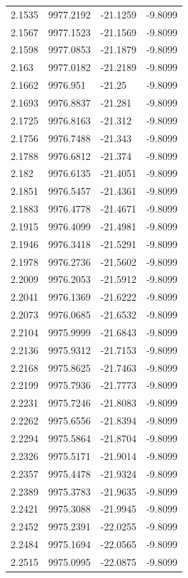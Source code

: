 \begin{table}[H]
\begin{tabular}{llll}
2.1535 & 9977.2192 & -21.1259 & -9.8099 \\
2.1567 & 9977.1523 & -21.1569 & -9.8099 \\
2.1598 & 9977.0853 & -21.1879 & -9.8099 \\
2.163 & 9977.0182 & -21.2189 & -9.8099 \\
2.1662 & 9976.951 & -21.25 & -9.8099 \\
2.1693 & 9976.8837 & -21.281 & -9.8099 \\
2.1725 & 9976.8163 & -21.312 & -9.8099 \\
2.1756 & 9976.7488 & -21.343 & -9.8099 \\
2.1788 & 9976.6812 & -21.374 & -9.8099 \\
2.182 & 9976.6135 & -21.4051 & -9.8099 \\
2.1851 & 9976.5457 & -21.4361 & -9.8099 \\
2.1883 & 9976.4778 & -21.4671 & -9.8099 \\
2.1915 & 9976.4099 & -21.4981 & -9.8099 \\
2.1946 & 9976.3418 & -21.5291 & -9.8099 \\
2.1978 & 9976.2736 & -21.5602 & -9.8099 \\
2.2009 & 9976.2053 & -21.5912 & -9.8099 \\
2.2041 & 9976.1369 & -21.6222 & -9.8099 \\
2.2073 & 9976.0685 & -21.6532 & -9.8099 \\
2.2104 & 9975.9999 & -21.6843 & -9.8099 \\
2.2136 & 9975.9312 & -21.7153 & -9.8099 \\
2.2168 & 9975.8625 & -21.7463 & -9.8099 \\
2.2199 & 9975.7936 & -21.7773 & -9.8099 \\
2.2231 & 9975.7246 & -21.8083 & -9.8099 \\
2.2262 & 9975.6556 & -21.8394 & -9.8099 \\
2.2294 & 9975.5864 & -21.8704 & -9.8099 \\
2.2326 & 9975.5171 & -21.9014 & -9.8099 \\
2.2357 & 9975.4478 & -21.9324 & -9.8099 \\
2.2389 & 9975.3783 & -21.9635 & -9.8099 \\
2.2421 & 9975.3088 & -21.9945 & -9.8099 \\
2.2452 & 9975.2391 & -22.0255 & -9.8099 \\
2.2484 & 9975.1694 & -22.0565 & -9.8099 \\
2.2515 & 9975.0995 & -22.0875 & -9.8099 \\

\end{tabular}
\end{table}
